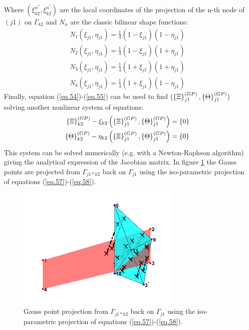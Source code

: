 Where $(\xi_{k2}^{n^*},\xi_{k2}^{n^*})$ are the local coordinates of the projection of the n-th node of $(j1)$ on $\Gamma_{k2}$ and $N_n$ are the classic bilinear shape functions:
\begin{equation}
\begin{array}{cc}
\label{eq.56}
N_1\left( \xi_{j1},\eta_{j1}\right)=\frac{1}{4}\left( 1-\xi_{j1}\right)\left( 1-\eta_{j1}\right) \\ N_2\left( \xi_{j1},\eta_{j1}\right)=\frac{1}{4}\left( 1-\xi_{j1}\right)\left( 1+\eta_{j1}\right) \\
N_3\left( \xi_{j1},\eta_{j1}\right)=\frac{1}{4}\left( 1+\xi_{j1}\right)\left( 1+\eta_{j1}\right) \\ N_4\left( \xi_{j1},\eta_{j1}\right)=\frac{1}{4}\left( 1+\xi_{j1}\right)\left( 1-\eta_{j1}\right)
\end{array}
\end{equation}
Finally, equation (\ref{eq.54})-(\ref{eq.55}) can be used to find $(\left\lbrace{\Xi}\right \rbrace_{j1}^{(GP)},\left\lbrace{\Theta}\right \rbrace_{j1}^{(GP)})$ solving another nonlinear system of equations:
\begin{eqnarray}
\label{eq.57}
\left\lbrace{\Xi}\right \rbrace_{k2}^{(GP)}-\xi_{k2}\left( \left\lbrace{\Xi}\right \rbrace_{j1}^{(GP)},\left\lbrace{\Theta}\right \rbrace_{j1}^{(GP)}\right)=\left\lbrace{0}\right \rbrace \\
\label{eq.58}
\left\lbrace{\Theta}\right \rbrace_{k2}^{(GP)}-\eta_{k2}\left( \left\lbrace{\Xi}\right \rbrace_{j1}^{(GP)},\left\lbrace{\Theta}\right \rbrace_{j1}^{(GP)}\right)=\left\lbrace{0}\right \rbrace 
\end{eqnarray}
This system can be solved numerically (e.g. with a Newton-Raphson algorithm) giving the analytical expression of the Jacobian matrix. In figure \ref{fig.12} the Gauss points are projected from $\Gamma_{j1*k2}$ back on $\Gamma_{j1}$ using the iso-parametric projection of equations (\ref{eq.57})-(\ref{eq.58}).
\begin{figure}[ht]
\centering
\includegraphics[width=8cm]{images/Ch1/PGproj}
\caption{Gauss point projection from $\Gamma_{j1*k2}$ back on $\Gamma_{j1}$ using the iso-parametric projection of equations (\ref{eq.57})-(\ref{eq.58}).}  
\label{fig.12}
\end{figure}
